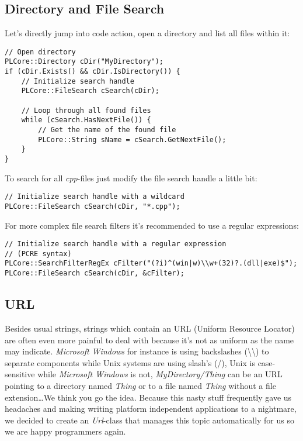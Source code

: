 \subsection{Directory and File Search}
Let's directly jump into code action, open a directory and list all files within it:

\begin{lstlisting}[caption=Directory and file search usage example]
// Open directory
PLCore::Directory cDir("MyDirectory");
if (cDir.Exists() && cDir.IsDirectory()) {
	// Initialize search handle
	PLCore::FileSearch cSearch(cDir);

	// Loop through all found files
	while (cSearch.HasNextFile()) {
		// Get the name of the found file
		PLCore::String sName = cSearch.GetNextFile();
	}
}
\end{lstlisting}

To search for all \emph{cpp}-files just modify the file search handle a little bit:

\begin{lstlisting}[caption=Wildcard search handle]
// Initialize search handle with a wildcard
PLCore::FileSearch cSearch(cDir, "*.cpp");
\end{lstlisting}

For more complex file search filters it's recommended to use a regular expressions:

\begin{lstlisting}[caption=Regular expression search handle]
// Initialize search handle with a regular expression
// (PCRE syntax)
PLCore::SearchFilterRegEx cFilter("(?i)^(win|w)\\w+(32)?.(dll|exe)$");
PLCore::FileSearch cSearch(cDir, &cFilter);
\end{lstlisting}




\subsection{URL}
Besides usual strings, strings which contain an URL (Uniform Resource Locator) are often even more painful to deal with because it's not as uniform as the name may indicate. \emph{Microsoft Windows} for instance is using backslashes (\textbackslash\textbackslash) to separate components while Unix systems are using slash's (/), Unix is case-sensitive while \emph{Microsoft Windows} is not, \emph{MyDirectory/Thing} can be an URL pointing to a directory named \emph{Thing} or to a file named \emph{Thing} without a file extension\ldots We think you go the idea. Because this nasty stuff frequently gave us headaches and making writing platform independent applications to a nightmare, we decided to create an \emph{Url}-class that manages this topic automatically for us so we are happy programmers again.

